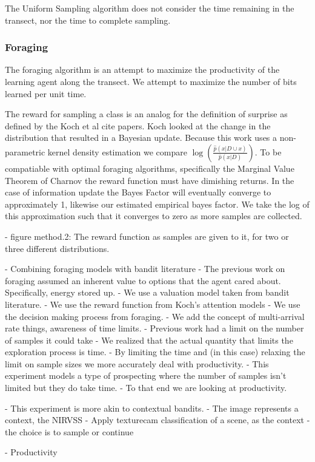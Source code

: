 The Uniform Sampling algorithm does not consider the time remaining in the
transect, nor the time to complete sampling.

\subsubsection{Foraging}

The foraging algorithm is an attempt to maximize the productivity of the learning agent along the transect.  We attempt to maximize the number of bits learned per unit time.

The reward for sampling a class is an analog for the definition of surprise
as defined by the Koch et al {cite papers}.  Koch looked at the change in the
distribution that resulted in a Bayesian update.  Because this work uses a
non-parametric kernel density estimation we compare
$\log\left(\frac{\hat{p}(x|D\cup{x})}{\hat{p}(x|D)}\right)$.  To be compatiable
with optimal foraging algorithms, specifically the Marginal Value Theorem of
Charnov \cite{charnov1973optimal} the reward function must have dimishing
returns.  In the case of information update the Bayes Factor will eventually
converge to approximately 1, likewise our estimated empirical bayes factor.  We
take the log of this approximation such that it converges to zero as more
samples are collected.


	- figure method.2: The reward function as samples are given to it, for two or three different distributions.

	- Combining foraging models with bandit literature 
		- The previous work on foraging assumed an inherent value to
			options that the agent cared about.  Specifically, energy stored up.
		- We use a valuation model taken from bandit literature.  
		- We use the reward function from Koch's attention models
		- We use the decision making process from foraging. 
		- We add the concept of multi-arrival rate things, awareness of time limits.
	- Previous work had a limit on the number of samples it could take
		- We realized that the actual quantity that limits the exploration process
			is time.
		- By limiting the time and (in this case) relaxing the limit on sample sizes we more accurately deal with productivity.  
	- This experiment models a type of prospecting where the number of samples isn't limited but they do take time. 
	- To that end we are looking at productivity.

	-  This experiment is more akin to contextual bandits.  
	- The image represents a context, the NIRVSS 
	- Apply texturecam classification of a scene, as the context
	- the choice is to sample or continue

	- Productivity 


